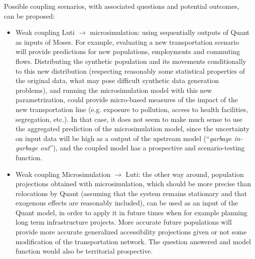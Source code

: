 Possible coupling scenarios, with associated questions and potential outcomes, can be proposed:
\begin{itemize}
	\item Weak coupling Luti $\rightarrow$ microsimulation: using sequentially outputs of Quant as inputs of Moses. For example, evaluating a new transportation scenario will provide predictions for new populations, employments and commuting flows. Distributing the synthetic population and its movements conditionally to this new distribution (respecting reasonably some statistical properties of the original data, what may pose difficult synthetic data generation problems), and running the microsimulation model with this new parametrization, could provide micro-based measures of the impact of the new transportation line (e.g. exposure to pollution, access to health facilities, segregation, etc.). In that case, it does not seem to make much sense to use the aggregated prediction of the microsimulation model, since the uncertainty on input data will be high as a output of the upstream model (``\textit{garbage in-garbage out}''), and the coupled model has a prospective and scenario-testing function.
	\item Weak coupling Microsimulation $\rightarrow$ Luti: the other way around, population projections obtained with microsimulation, which should be more precise than relocations by Quant (assuming that the system remains stationary and that exogenous effects are reasonably included), can be used as an input of the Quant model, in order to apply it in future times when for example planning long term infrastructure projects. More accurate future populations will provide more accurate generalized accessibility projections given or not some modification of the transportation network. The question answered and model function would also be territorial prospective. %

\end{itemize}

